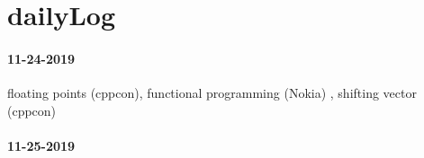 \section{dailyLog}
\paragraph{11-24-2019} floating points (cppcon), functional programming (Nokia) , shifting vector (cppcon)
\paragraph{11-25-2019}



